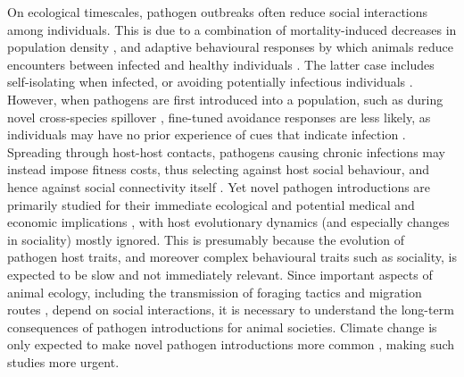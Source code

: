 On ecological timescales, pathogen outbreaks often reduce social interactions among individuals.
This is due to a combination of mortality-induced decreases in population density \autocite[e.g.][]{fereidouni2019,monk2022}, and adaptive behavioural responses by which animals reduce encounters between infected and healthy individuals \autocite{stroeymeyt2018,pusceddu2021,stockmaier2021,weinstein2018}.
The latter case includes self-isolating when infected, or avoiding potentially infectious individuals \autocite{stroeymeyt2018,pusceddu2021,stockmaier2021,weinstein2018}.
However, when pathogens are first introduced into a population, such as during novel cross-species spillover \autocite{kuchipudi2022,chandler2021}, fine-tuned avoidance responses are less likely, as individuals may have no prior experience of cues that indicate infection \autocite{weinstein2018,stockmaier2021}.
Spreading through host-host contacts, pathogens causing chronic infections \autocite{bastos2000,jolles2021,vosloo2009} may instead impose fitness costs, thus selecting against host social behaviour, and hence against social connectivity itself \autocite{altizer2003,cantor2021,romano2021,poulin2021,ashby2022}.
Yet novel pathogen introductions are primarily studied for their immediate ecological \autocite{monk2022,fereidouni2019,blehert2009} and potential medical \autocite{wille2022,chandler2021,kuchipudi2022,levi2012} and economic implications \autocite[][]{keeling2001,goulson2015,jolles2021}, with host evolutionary dynamics (and especially changes in sociality) mostly ignored.
This is presumably because the evolution of pathogen host traits, and moreover complex behavioural traits such as sociality, is expected to be slow and not immediately relevant.
Since important aspects of animal ecology, including the transmission of foraging tactics \autocite{klump2021} and migration routes \autocite{jesmer2018,guttal2010}, depend on social interactions, it is necessary to understand the long-term consequences of pathogen introductions for animal societies.
Climate change is only expected to make novel pathogen introductions more common \autocite{sanderson2020,carlson2022a}, making such studies more urgent.

